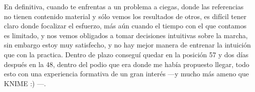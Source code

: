 \documentclass{article}
\begin{document}
En definitiva, cuando te enfrentas a un problema a ciegas, donde las referencias no tienen contenido material y sólo vemos los resultados de otros, es difícil tener claro donde focalizar el esfuerzo, más aún cuando el tiempo con el que contamos es limitado, y nos vemos obligados a tomar decisiones intuitivas sobre la marcha, sin embargo estoy muy satisfecho, y no hay mejor manera de entrenar la intuición que con la practica. Dentro de plazo conseguí quedar en la posición 57 y dos días después en la 48, dentro del podio que era donde me había propuesto llegar, todo esto con una experiencia formativa de un gran interés ---y mucho más ameno que KNIME :) ---.
\end{document}
